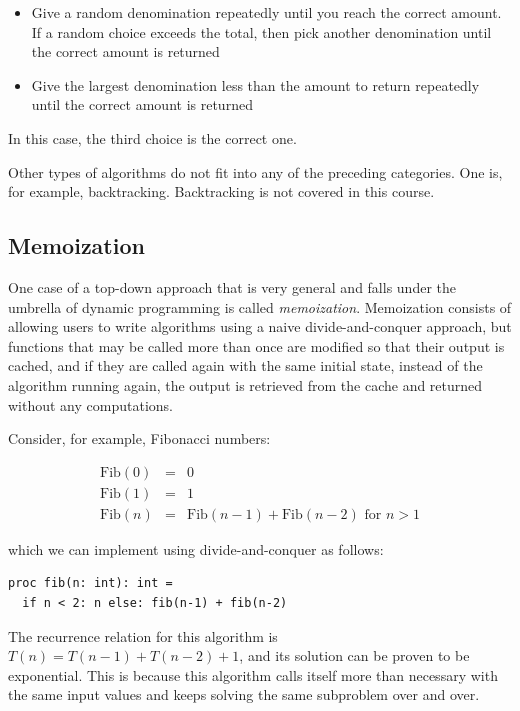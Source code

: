 \documentclass[justified, sixbynine]{tufte-book}
\theoremstyle{plain}%
\newtheorem * {corollary}{Corollary}
\theoremstyle{definition}
\theoremstyle{remark}
\newtheorem * {remark}{Remark}
\newtheorem * {note}{Note}
\begin{document}
\begin{fullwidth}
\begin{itemize}
\item Give a random denomination repeatedly until you reach the correct amount. If a random choice exceeds the total, then pick another denomination until the correct amount is returned

\item Give the largest denomination less than the amount to return repeatedly until the correct amount is returned
\end{itemize}

In this case, the third choice is the correct one.

Other types of algorithms do not fit into any of the preceding
categories. One is, for example, backtracking. Backtracking is not covered
in this course.

\goodbreak\subsection{Memoization}


One case of a top-down approach that is very general and falls under the umbrella of dynamic programming is called {\it memoization}. Memoization consists of allowing users to write algorithms using a naive divide-and-conquer approach, but functions that may be called more than once are modified so that their output is cached, and if they are called again with the same initial state, instead of the algorithm running again, the output is retrieved from the cache and returned without any computations.


Consider, for example, Fibonacci numbers:

\begin{eqnarray}
\textrm{Fib}(0)&=&0\\
\textrm{Fib}(1)&=&1\\
\textrm{Fib}(n)&=&\textrm{Fib}(n-1)+\textrm{Fib}(n-2)\textrm{ for }n>1
\end{eqnarray}

which we can implement using divide-and-conquer as follows:

\begin{lstlisting}
proc fib(n: int): int =
  if n < 2: n else: fib(n-1) + fib(n-2)
\end{lstlisting}

The recurrence relation for this algorithm is $T(n)=T(n-1)+T(n-2)+1$, and its solution can be proven to be exponential. This is because this algorithm calls itself more than necessary with the same input values and keeps solving the same subproblem over and over.


\end{fullwidth}
\end{document}

